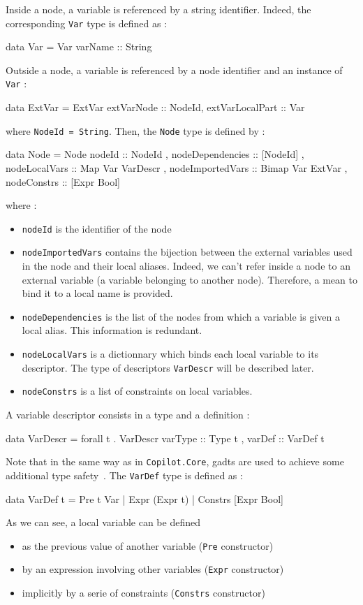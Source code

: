Inside a node, a variable is referenced by a string identifier. Indeed, the corresponding \texttt{Var} type is defined as :
\begin{code}
data Var = Var {varName :: String}
\end{code}
Outside a node, a variable is referenced by a node identifier and an instance of \texttt{Var} :
\begin{code}
data ExtVar = ExtVar {extVarNode :: NodeId, extVarLocalPart :: Var} 
\end{code}
where \texttt{NodeId = String}. Then, the \texttt{Node} type is defined by :
\begin{code}
data Node = Node
  { nodeId            :: NodeId
  , nodeDependencies  :: [NodeId]
  , nodeLocalVars     :: Map Var VarDescr
  , nodeImportedVars  :: Bimap Var ExtVar 
  , nodeConstrs       :: [Expr Bool] }
\end{code} where :
\begin{itemize}
\item \texttt{nodeId} is the identifier of the node
\item \texttt{nodeImportedVars} contains the bijection between the external variables used in the node and their local aliases. Indeed, we can't refer inside a node to an external variable (a variable belonging to another node). Therefore, a mean to bind it to a local name is provided.
\item \texttt{nodeDependencies} is the list of the nodes from which a variable is given a local alias. This information is redundant.
\item \texttt{nodeLocalVars} is a dictionnary which binds each local variable to its descriptor. The type of descriptors \texttt{VarDescr} will be described later.
\item \texttt{nodeConstrs} is a list of constraints on local variables.
\end{itemize}
A variable descriptor consists in a type and a definition :
\begin{code}
data VarDescr = forall t . VarDescr
  { varType :: Type t
  , varDef  :: VarDef t }
\end{code}
Note that in the same way as in \texttt{Copilot.Core}, {\sc gadt}s are used to achieve some additional type safety~\cite{}. The \texttt{VarDef} type is defined as :
\begin{code}
data VarDef t =
    Pre t Var
  | Expr (Expr t)
  | Constrs [Expr Bool]
\end{code}
As we can see, a local variable can be defined
\begin{itemize}
\item as the previous value of another variable (\texttt{Pre} constructor)
\item by an expression involving other variables (\texttt{Expr} constructor)
\item implicitly by a serie of constraints (\texttt{Constrs} constructor)
\end{itemize}
